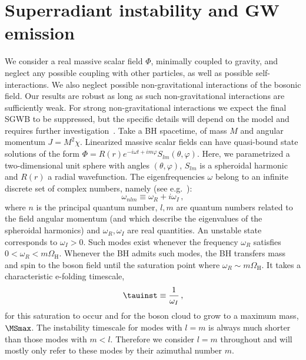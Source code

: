 \documentclass[
reprint,           %
superscriptaddress,%
amsmath,           %
amssymb,           %
aps,               %
prd,               %
notitlepage,       %
floatfix,          %
nofootinbib %
]{revtex4-1}
\def\e{\begin{equation}}
\def\q{\end{equation}}
\begin{document}
\section{Superradiant instability and GW emission}
We consider a real massive scalar field $\Phi$, minimally coupled to gravity, and neglect any possible coupling with other particles, as well as possible self-interactions.
We also neglect possible non-gravitational interactions of the bosonic field. Our results are robust as long as such non-gravitational interactions are sufficiently weak. For strong non-gravitational interactions we expect the final SGWB to be suppressed, but the specific details will depend on the model and requires further investigation~\cite{Yoshino:2015nsa,Rosa:2017ury,Ikeda:2018nhb,Boskovic:2018lkj,Fukuda:2019ewf,Mathur:2020aqv,Baryakhtar:2020gao,Omiya:2020vji}.
%
Take a BH spacetime, of mass $M$ and angular momentum $J=M^2\chi$. Linearized massive scalar fields can have quasi-bound state solutions of the form $\Phi=R(r)e^{-i\omega t+im\varphi}S_{lm}(\theta,\varphi)$. Here, we parametrized a two-dimensional unit sphere with angles $(\theta,\varphi)$, $S_{lm}$ is a spheroidal harmonic~\cite{Berti:2005gp} and $R(r)$ a radial wavefunction.
The eigenfrequencies $\omega$ belong to an infinite discrete set of complex numbers, namely (see e.g.~\cite{Brito:2015oca}):
\e
\omega_{nlm}\equiv \omega_R+i\omega_I\,,
\q
where $n$ is the principal quantum number, $l,m$ are quantum numbers related to the field angular momentum (and which describe the eigenvalues of the spheroidal harmonics) and $\omega_R,\omega_I$ are real quantities. An unstable state corresponds to $\omega_I>0$. Such modes exist whenever the frequency $\omega_R$ satisfies $0<\omega_R<m\Omega_{\mathrm{H}}$. Whenever the BH admits such modes, the BH transfers mass and spin to the boson field until the saturation point where $\omega_R\sim m\Omega_\mathrm{H}$. It takes a characteristic e-folding timescale, 
\begin{equation}
\tauinst\equiv \frac{1}{\omega_I}\,,
\end{equation}
%
for this saturation to occur and for the boson cloud to grow to a maximum mass, $\MSmax$. The instability timescale for modes with $l=m$ is always much shorter than those modes with $m<l$. Therefore we consider $l=m$ throughout and will mostly only refer to these modes by their azimuthal number $m$.
\end{document}
